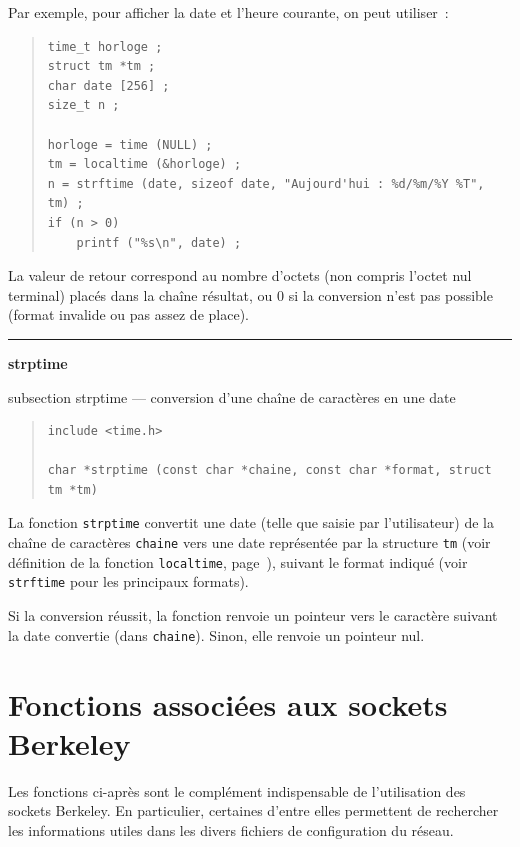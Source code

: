 \documentclass [twoside] {report}
\newcommand {\primitive} [1]
    {
	\phantomsection
	{\large \textbf {#1}}
	\addcontentsline {toc} {subsection} {#1}
    }
\newcommand {\separation}
    {
	\vspace {5mm}
	\nopagebreak
	\hrule
    }
\begin{document}
Par exemple, pour afficher la date et l'heure courante, on peut utiliser~:
\begin {quote}
\begin {verbatim}
time_t horloge ;
struct tm *tm ;
char date [256] ;
size_t n ;

horloge = time (NULL) ;
tm = localtime (&horloge) ;
n = strftime (date, sizeof date, "Aujourd'hui : %
if (n > 0)
    printf ("%
\end{verbatim}
\end {quote}

La valeur de retour correspond au nombre d'octets (non compris l'octet
nul terminal) placés dans la chaîne résultat, ou 0 si la conversion
n'est pas possible (format invalide ou pas assez de place).


\separation
\primitive {strptime} --- conversion d'une chaîne de caractères en une date

\begin {quote}
\begin {verbatim}
include <time.h>

char *strptime (const char *chaine, const char *format, struct tm *tm)
\end{verbatim}
\end {quote}

La fonction \texttt {strptime} convertit une date (telle que saisie par
l'utilisateur) de la chaîne de caractères \texttt {chaine} vers une
date représentée par la structure \texttt {tm} (voir définition de
la fonction \texttt {localtime}, page~\pageref {struct-tm}), suivant le
format indiqué (voir \texttt {strftime} pour les principaux formats).

Si la conversion réussit, la fonction renvoie un pointeur vers le
caractère suivant la date convertie (dans \texttt {chaine}). Sinon,
elle renvoie un pointeur nul.


\section {Fonctions associées aux sockets Berkeley}

Les fonctions ci-après sont le complément indispensable de l'utilisation
des sockets Berkeley.  En particulier, certaines d'entre elles
permettent de rechercher les informations utiles dans les divers
fichiers de configuration du réseau.
\end{document}
